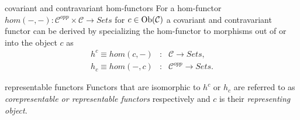\begin{frame}
\begin{block}{covariant and contravariant hom-functors}
For a hom-functor $hom(-,-): \mathcal{C}^{opp} \times \mathcal{C} \rightarrow \textit{Sets}$ for $c \in \mathop{\rm Ob}\nolimits(\mathcal{C})$ a covariant and contravariant functor can be derived by specializing the hom-functor to morphisms out of or into the object $c$ as
\begin{eqnarray*}
h^c \equiv hom(c,-) &:& \mathcal{C} \rightarrow \textit{Sets},\\
h_c \equiv hom(-,c) &:& \mathcal{C}^{opp} \rightarrow \textit{Sets}.
\end{eqnarray*}
\end{block}
\begin{block}{representable functors}
Functors that are isomorphic to $h^c$ or $h_c$ are referred to as {\it corepresentable or representable functors} respectively and $c$ is their {\it representing object}.
\end{block}
\end{frame}
